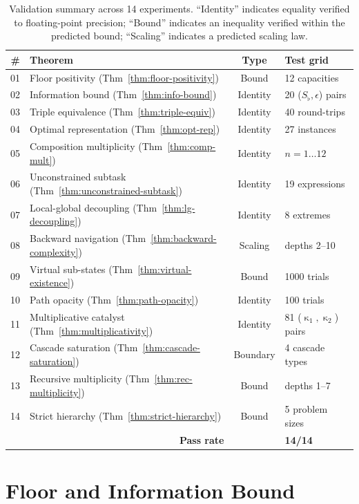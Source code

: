 \documentclass[twocolumn,a4paper]{article}
\DeclareMathOperator{\catpow}{\kappa}
\newcommand{\Sfloor}{S_{\flat}}
\begin{document}
\begin{table}[!htbp]
\centering
\small
\caption{Validation summary across 14 experiments. ``Identity'' indicates equality verified to floating-point precision; ``Bound'' indicates an inequality verified within the predicted bound; ``Scaling'' indicates a predicted scaling law.}
\label{tab:val-summary}
\begin{tabular}{rlcl}
\toprule
\# & Theorem & Type & Test grid \\
\midrule
01 & Floor positivity (Thm~\ref{thm:floor-positivity}) & Bound & 12 capacities \\
02 & Information bound (Thm~\ref{thm:info-bound}) & Identity & 20 ($\Sfloor,\epsilon$) pairs \\
03 & Triple equivalence (Thm~\ref{thm:triple-equiv}) & Identity & 40 round-trips \\
04 & Optimal representation (Thm~\ref{thm:opt-rep}) & Identity & 27 instances \\
05 & Composition multiplicity (Thm~\ref{thm:comp-mult}) & Identity & $n=1\ldots 12$ \\
06 & Unconstrained subtask (Thm~\ref{thm:unconstrained-subtask}) & Identity & 19 expressions \\
07 & Local-global decoupling (Thm~\ref{thm:lg-decoupling}) & Identity & 8 extremes \\
08 & Backward navigation (Thm~\ref{thm:backward-complexity}) & Scaling & depths 2--10 \\
09 & Virtual sub-states (Thm~\ref{thm:virtual-existence}) & Bound & 1000 trials \\
10 & Path opacity (Thm~\ref{thm:path-opacity}) & Identity & 100 trials \\
11 & Multiplicative catalyst (Thm~\ref{thm:multiplicativity}) & Identity & 81 ($\catpow_{1},\catpow_{2}$) pairs \\
12 & Cascade saturation (Thm~\ref{thm:cascade-saturation}) & Boundary & 4 cascade types \\
13 & Recursive multiplicity (Thm~\ref{thm:rec-multiplicity}) & Bound & depths 1--7 \\
14 & Strict hierarchy (Thm~\ref{thm:strict-hierarchy}) & Bound & 5 problem sizes \\
\midrule
\multicolumn{2}{r}{\textbf{Pass rate}} & & \textbf{14/14} \\
\bottomrule
\end{tabular}
\end{table}

\section{Floor and Information Bound}
\end{document}
